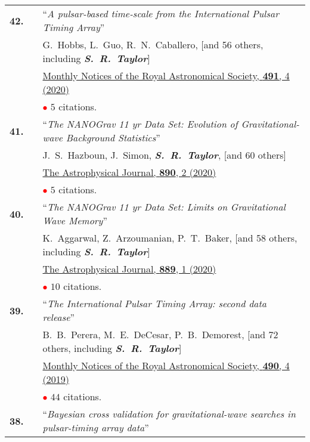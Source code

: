 \documentclass[11pt,letterpaper,sans]{moderncv}
\begin{document}
{\begin{longtable}{rp{0.3cm}p{15.8cm}}
\textbf{42.} & & ``\textit{A pulsar-based time-scale from the International Pulsar Timing Array}'' \\ 
&&G.~Hobbs, L.~Guo, R.~N.~Caballero, [and 56 others, including \textit{\textbf{S.~R.~Taylor}}] \\
&& \href{https://ui.adsabs.harvard.edu/link_gateway/2020MNRAS.491.5951H/PUB_HTML}{{\color{color1} Monthly Notices of the Royal Astronomical Society, \textbf{491}, 4 (2020)}} \\
&& \textcolor{red}{$\bullet$} $5$ citations. \vspace{0.09cm}\\
\textbf{41.} & & ``\textit{The NANOGrav 11 yr Data Set: Evolution of Gravitational-wave Background Statistics}'' \\ 
&&J.~S.~Hazboun, J.~Simon, \textit{\textbf{S.~R.~Taylor}}, [and 60 others] \\
&& \href{https://ui.adsabs.harvard.edu/link_gateway/2020ApJ...890..108H/PUB_HTML}{{\color{color1} The Astrophysical Journal, \textbf{890}, 2 (2020)}} \\
&& \textcolor{red}{$\bullet$} $5$ citations. \vspace{0.09cm}\\
\textbf{40.} & & ``\textit{The NANOGrav 11 yr Data Set: Limits on Gravitational Wave Memory}'' \\ 
&&K.~Aggarwal, Z.~Arzoumanian, P.~T.~Baker, [and 58 others, including \textit{\textbf{S.~R.~Taylor}}] \\
&& \href{https://iopscience.iop.org/article/10.3847/1538-4357/ab6083}{{\color{color1} The Astrophysical Journal, \textbf{889}, 1 (2020)}} \\
&& \textcolor{red}{$\bullet$} $10$ citations. \vspace{0.09cm}\\
\textbf{39.} & & ``\textit{The International Pulsar Timing Array: second data release}'' \\ 
&&B.~B.~Perera, M.~E.~DeCesar, P.~B.~Demorest, [and 72 others, including \textit{\textbf{S.~R.~Taylor}}] \\
&& \href{https://academic.oup.com/mnras/article-abstract/490/4/4666/5586597?redirectedFrom=fulltext}{{\color{color1} Monthly Notices of the Royal Astronomical Society, \textbf{490}, 4 (2019)}} \\
&& \textcolor{red}{$\bullet$} $44$ citations. \vspace{0.09cm}\\
\textbf{38.} & & ``\textit{Bayesian cross validation for gravitational-wave searches in pulsar-timing array data}'' \\ 

\end{longtable}}
\end{document}
